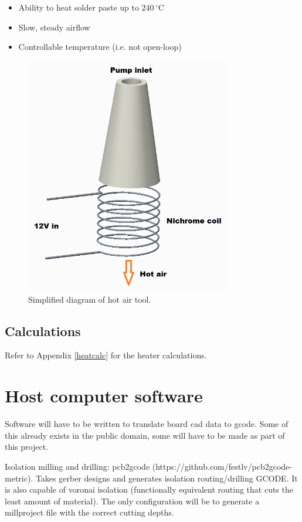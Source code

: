 \begin{itemize} \itemsep0em
	\item	Ability to heat solder paste up to $240\,^{\circ}\mathrm{C}$
	\item	Slow, steady airflow
	\item	Controllable temperature (i.e. not open-loop)
\end{itemize}

\begin{figure}[ht!]
\centering
\includegraphics[width=90mm]{resources/hotair.png}
\caption{Simplified diagram of hot air tool.}
\label{overflow}
\end{figure}

\subsection{Calculations}

Refer to Appendix \ref{heatcalc} for the heater calculations.

\section{Host computer software}
Software will have to be written to translate board cad data to gcode. Some of this already exists in the public domain, some will have to be made
as part of this project.

Isolation milling and drilling: pcb2gcode (https://github.com/festlv/pcb2gcode-metric). Takes gerber designs and generates isolation routing/drilling
GCODE. It is also capable of voronai isolation (functionally equivalent routing that cuts the least amount of material). The only configuration
will be to generate a millproject file with the correct cutting depths.

